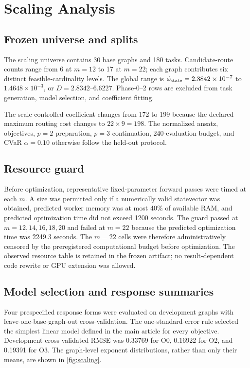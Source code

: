 \section{Scaling Analysis}
\label{app:scaling}

\subsection{Frozen universe and splits}

The scaling universe contains 30 base graphs and 180 tasks. Candidate-route
counts range from 6 at $m=12$ to 17 at $m=22$; each graph contributes six
distinct feasible-cardinality levels. The global range is
$\phi_{\mathrm{state}}=2.3842\times10^{-7}$ to $1.4648\times10^{-3}$, or
$D=2.8342$--6.6227. Phase-0--2 rows are excluded from task generation, model
selection, and coefficient fitting.

The scale-controlled coefficient changes from 172 to 199 because the declared
maximum routing cost changes to $22\times9=198$. The normalized ansatz,
objectives, $p=2$ preparation, $p=3$ continuation, 240-evaluation budget, and
CVaR $\alpha=0.10$ otherwise follow the held-out protocol.

\subsection{Resource guard}

Before optimization, representative fixed-parameter forward passes were timed
at each $m$. A size was permitted only if a numerically valid statevector was
obtained, predicted worker memory was at most 40\% of available RAM, and
predicted optimization time did not exceed 1200 seconds. The guard passed at
$m=12,14,16,18,20$ and failed at $m=22$ because the predicted optimization
time was 2249.3 seconds. The $m=22$ cells were therefore administratively
censored by the preregistered computational budget before optimization. The
observed resource table is retained in the frozen artifact; no result-dependent
code rewrite or GPU extension was allowed.

\subsection{Model selection and response summaries}

Four prespecified response forms were evaluated on development graphs with
leave-one-base-graph-out cross-validation. The one-standard-error rule selected
the simplest linear model defined in the main article for every objective. Development
cross-validated RMSE was 0.33769 for O0, 0.16922 for O2, and 0.19391 for O3.
The graph-level exponent distributions, rather than only their means, are
shown in \cref{fig:scaling}.

